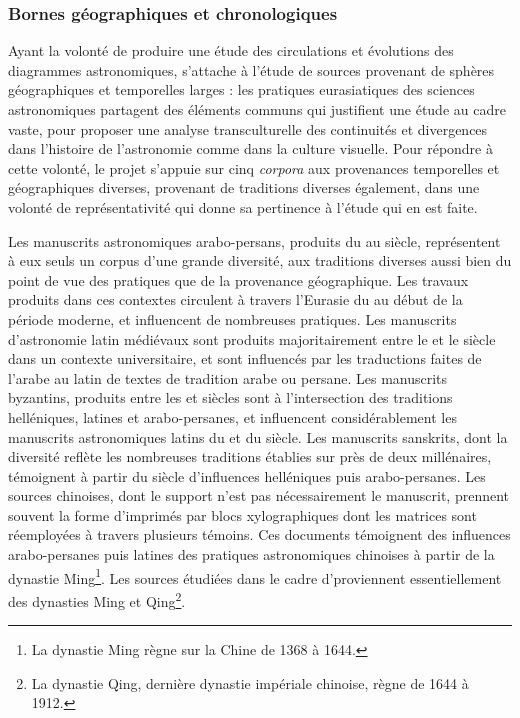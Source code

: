         \subsubsection{Bornes géographiques et chronologiques}
Ayant la volonté de produire une étude des circulations et évolutions des diagrammes astronomiques, \eida s'attache à l'étude de sources provenant de sphères géographiques et temporelles larges : les pratiques eurasiatiques des sciences astronomiques partagent des éléments communs qui justifient une étude au cadre vaste, pour proposer une analyse transculturelle des continuités et divergences dans l'histoire de l'astronomie comme dans la culture visuelle. Pour répondre à cette volonté, le projet \eida s'appuie sur cinq \textit{corpora} aux provenances temporelles et géographiques diverses, provenant de traditions diverses également, dans une volonté de représentativité qui donne sa pertinence à l'étude qui en est faite. 

Les manuscrits astronomiques arabo-persans, produits du \viii au \xviii siècle, représentent à eux seuls un corpus d'une grande diversité, aux traditions diverses aussi bien du point de vue des pratiques que de la provenance géographique. Les travaux produits dans ces contextes circulent à travers l'Eurasie du \ma au début de la période moderne, et influencent de nombreuses pratiques. Les manuscrits d'astronomie latin médiévaux sont produits majoritairement entre le \xiii et le \xvi siècle dans un contexte universitaire, et sont influencés par les traductions faites de l'arabe au latin de textes de tradition arabe ou persane. Les manuscrits byzantins, produits entre les \ix et \xv siècles sont à l'intersection des traditions helléniques, latines et arabo-persanes, et influencent considérablement les manuscrits astronomiques latins du \xv et du \xvi siècle. Les manuscrits sanskrits, dont la diversité reflète les nombreuses traditions établies sur près de deux millénaires, témoignent à partir du \xie siècle d'influences helléniques puis arabo-persanes. Les sources chinoises, dont le support n'est pas nécessairement le manuscrit, prennent souvent la forme d'imprimés par blocs xylographiques dont les matrices sont réemployées à travers plusieurs témoins. Ces documents témoignent des influences arabo-persanes puis latines des pratiques astronomiques chinoises à partir de la dynastie Ming\footnote{La dynastie Ming règne sur la Chine de 1368 à 1644.}. Les sources étudiées dans le cadre d'\eida proviennent essentiellement des dynasties Ming et Qing\footnote{La dynastie Qing, dernière dynastie impériale chinoise, règne de 1644 à 1912.}.

